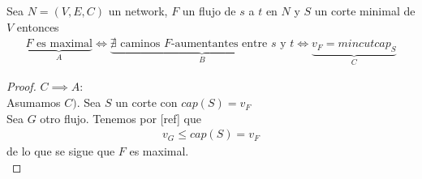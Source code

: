 \begin{theorem}
Sea $N = (V,E,C)$ un network, $F$ un flujo de $s$ a $t$ en $N$ y $S$ un corte minimal de $V$ entonces
\begin{align}
    \underbrace{F \text{ es maximal}}_{A} \iff 
    \underbrace{\nexists \text{ caminos } F\text{-aumentantes entre $s$ y $t$}}_{B} \iff
    \underbrace{v_F = mincutcap_S}_{C}
\end{align}
\end{theorem}
\begin{proof}
$C \implies A:$\\
Asumamos $C)$. Sea $S$ un corte con $cap(S) = v_F$\\
Sea $G$ otro flujo. Tenemos por [ref] que
\begin{align} v_G \le cap(S) = v_F \end{align}
de lo que se sigue que $F$ es maximal.\\


\end{proof}
